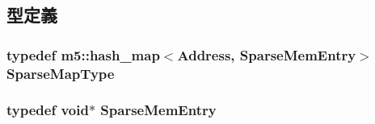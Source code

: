 \subsection{型定義}
\hypertarget{SparseMemory_8hh_a93e9b04c329a9452d20206c8e31a4172}{
\subsubsection[{SparseMapType}]{\setlength{\rightskip}{0pt plus 5cm}typedef m5::hash\_\-map$<${\bf Address}, {\bf SparseMemEntry}$>$ {\bf SparseMapType}}}
\label{SparseMemory_8hh_a93e9b04c329a9452d20206c8e31a4172}
\hypertarget{SparseMemory_8hh_a5d79201ca807d6e5b23968dba80949e3}{
\subsubsection[{SparseMemEntry}]{\setlength{\rightskip}{0pt plus 5cm}typedef void$\ast$ {\bf SparseMemEntry}}}
\label{SparseMemory_8hh_a5d79201ca807d6e5b23968dba80949e3}
